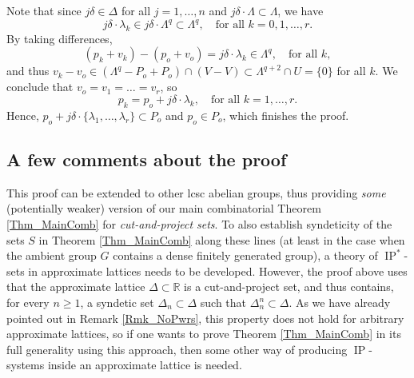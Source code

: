 \documentclass[12pt,reqno,a4paper]{amsart}
\numberwithin{equation}{section}
\newcommand{\bR}{\mathbb{R}}
\DeclareMathOperator{\IP}{IP}
\theoremstyle{theorem}
\theoremstyle{task}
\theoremstyle{definition}
\begin{document}
Note that since $j\delta \in \Delta$ for all $j = 1,\ldots,n$ and $j\delta \cdot \Lambda \subset \Lambda$, we have
\[
j\delta \cdot \lambda_k \in j\delta \cdot \Lambda^q \subset \Lambda^q, \quad \textrm{for all $k=0,1,\ldots,r$}.
\]
By taking differences, 
\[
(p_k + v_k) - (p_o + v_o) = j\delta \cdot \lambda_k \in \Lambda^q, \quad \textrm{for all $k$},
\]
and thus $v_k-v_o \in (\Lambda^q - P_o + P_o) \cap (V-V) \subset \Lambda^{q+2} \cap U = \{0\}$ for all $k$. We conclude that $v_o = v_1 = \ldots = v_r$, so 
\[
p_k = p_o + j\delta \cdot \lambda_k, \quad \textrm{for all $k=1,\ldots,r$}.
\]
Hence, $p_o + j\delta \cdot \{\lambda_1,\ldots,\lambda_r\} \subset P_o$ and $p_o \in 
P_o$, which finishes the proof.

\subsection*{A few comments about the proof}

This proof can be extended to other lcsc abelian groups, thus providing \emph{some} (potentially weaker) version of our main combinatorial Theorem \ref{Thm_MainComb} for \emph{cut-and-project sets}. To also establish syndeticity of the sets $S$ in Theorem \ref{Thm_MainComb} along these lines (at least in the case when the ambient group $G$
contains a dense finitely generated group), a theory of $\IP^*$-sets in approximate lattices needs to be developed. However, the proof above uses that the approximate lattice $\Delta \subset \bR$ is a cut-and-project set, and thus contains, for every $n \geq 1$, a syndetic set $\Delta_n \subset \Delta$ such that $\Delta_n^n \subset \Delta$. As we have already pointed out in Remark \ref{Rmk_NoPwrs}, this property does not hold for arbitrary approximate lattices, so if one wants to prove Theorem \ref{Thm_MainComb} in its full generality using this approach, then some other way of producing $\IP$-systems inside an approximate lattice is needed.
 
\end{document}
